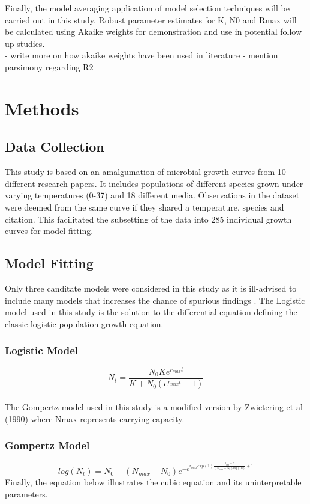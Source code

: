 \documentclass[11pt]{article}
\begin{document}
Finally, the model averaging application of model selection techniques will be carried out in this study. Robust parameter estimates for K, N0 and Rmax will be calculated using Akaike weights for demonstration and use in potential follow up studies.\\

- write more on how akaike weights have been used in literature
- mention parsimony regarding R2
\section{Methods}

    \subsection{Data Collection}
This study is based on an amalgumation of microbial growth curves from 10 different research papers. It includes populations of different species grown under varying temperatures (0-37) and 18 different media. Observations in the dataset were deemed from the same curve if they shared a temperature, species and citation. This facilitated the subsetting of the data into 285 individual growth curves for model fitting.

    \subsection*{Model Fitting}
Only three canditate models were considered in this study as it is ill-advised to include many models that increases the chance of spurious findings \cite{JOHNSON2004101}. The Logistic model used in this study is the solution to the differential equation defining the classic logistic population growth equation.
    \subsubsection{Logistic Model}
    \begin{equation}
        N_t = \frac{N_0Ke^{r_{max}t}}{K+N_0(e^{r_{max}t} - 1)}
      \end{equation}\\
The Gompertz model used in this study is a modified version by Zwietering et al (1990) \cite{Zwietering1990} where Nmax represents carrying capacity. 
    \subsubsection{Gompertz Model}
    \begin{equation}
        log(N_t) = N_0 + (N_{max}-N_0)e^{-e^{r_{max}exp(1)\frac{t_{lag}-t}{(N_{max}-N_0)log(10)}+1}}
        \end{equation}
Finally, the equation below illustrates the cubic equation and its uninterpretable parameters.
\end{document}
